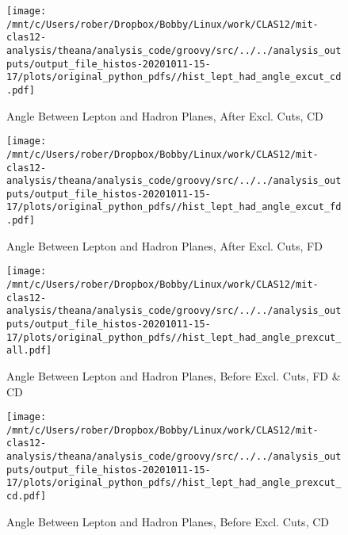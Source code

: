 \documentclass{article}
\begin{document}
\begin{landscape}
    \begin{figure}[h]
        \centering

        \texttt{[image: /mnt/c/Users/rober/Dropbox/Bobby/Linux/work/CLAS12/mit-clas12-analysis/theana/analysis\_code/groovy/src/../../analysis\_outputs/output\_file\_histos-20201011-15-17/plots/original\_python\_pdfs//hist\_lept\_had\_angle\_excut\_cd.pdf]}
        \captionsetup{textformat=empty,labelformat=blank}
        \caption{Angle Between Lepton and Hadron Planes, After Excl. Cuts, CD}
    \end{figure}
    \clearpage
    
    \begin{figure}[h]
        \centering

        \texttt{[image: /mnt/c/Users/rober/Dropbox/Bobby/Linux/work/CLAS12/mit-clas12-analysis/theana/analysis\_code/groovy/src/../../analysis\_outputs/output\_file\_histos-20201011-15-17/plots/original\_python\_pdfs//hist\_lept\_had\_angle\_excut\_fd.pdf]}
        \captionsetup{textformat=empty,labelformat=blank}
        \caption{Angle Between Lepton and Hadron Planes, After Excl. Cuts, FD}
    \end{figure}
    \clearpage
    
    \begin{figure}[h]
        \centering

        \texttt{[image: /mnt/c/Users/rober/Dropbox/Bobby/Linux/work/CLAS12/mit-clas12-analysis/theana/analysis\_code/groovy/src/../../analysis\_outputs/output\_file\_histos-20201011-15-17/plots/original\_python\_pdfs//hist\_lept\_had\_angle\_prexcut\_all.pdf]}
        \captionsetup{textformat=empty,labelformat=blank}
        \caption{Angle Between Lepton and Hadron Planes, Before Excl. Cuts, FD \& CD}
    \end{figure}
    \clearpage
    
    \begin{figure}[h]
        \centering

        \texttt{[image: /mnt/c/Users/rober/Dropbox/Bobby/Linux/work/CLAS12/mit-clas12-analysis/theana/analysis\_code/groovy/src/../../analysis\_outputs/output\_file\_histos-20201011-15-17/plots/original\_python\_pdfs//hist\_lept\_had\_angle\_prexcut\_cd.pdf]}
        \captionsetup{textformat=empty,labelformat=blank}
        \caption{Angle Between Lepton and Hadron Planes, Before Excl. Cuts, CD}
    \end{figure}
    \clearpage
    
    \begin{figure}[h]
        \centering


\end{figure}
\end{landscape}
\end{document}
